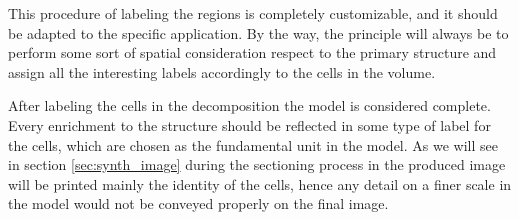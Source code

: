     This procedure of labeling the regions is completely customizable, and it should be adapted to the specific application. By the way, the principle will always be to perform some sort of spatial consideration respect to the primary structure and assign all the interesting labels accordingly to the cells in the volume.

    After labeling the cells in the decomposition the model is considered complete. Every enrichment to the structure should be reflected in some type of label for the cells, which are chosen as the fundamental unit in the model. As we will see in section \ref{sec:synth_image} during the sectioning process in the produced image will be printed mainly the identity of the cells, hence any detail on a finer scale in the model would not be conveyed properly on the final image.

